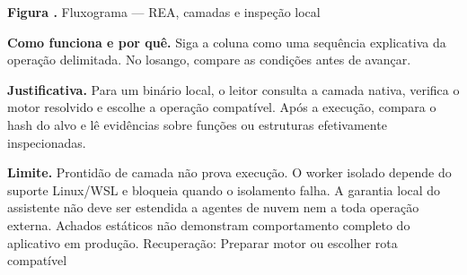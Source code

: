{\small\textbf{Figura \thefigure.} Fluxograma --- REA, camadas e inspeção local}\par\smallskip
\noindent\textbf{Como funciona e por quê.} Siga a coluna como uma sequência explicativa da operação delimitada. No losango, compare as condições antes de avançar.\par
\noindent\textbf{Justificativa.} Para um binário local, o leitor consulta a camada nativa, verifica o motor resolvido e escolhe a operação compatível. Após a execução, compara o hash do alvo e lê evidências sobre funções ou estruturas efetivamente inspecionadas.\par
\noindent\textbf{Limite.} Prontidão de camada não prova execução. O worker isolado depende do suporte Linux/WSL e bloqueia quando o isolamento falha. A garantia local do assistente não deve ser estendida a agentes de nuvem nem a toda operação externa. Achados estáticos não demonstram comportamento completo do aplicativo em produção. Recuperação: Preparar motor ou escolher rota compatível\par\smallskip
{}
